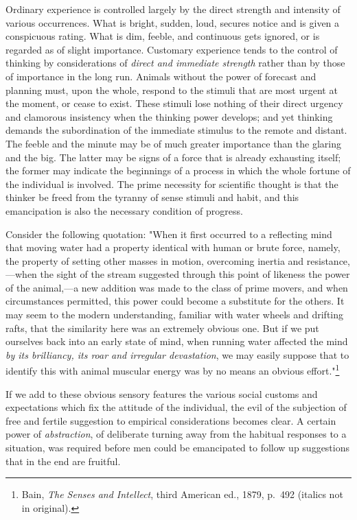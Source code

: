 \documentclass[showtrims,ustradepaper]{memoir}
\begin{document}
Ordinary experience is controlled largely by the direct strength and
intensity of various occurrences. What is bright, sudden, loud, secures
notice and is given a conspicuous rating. What is dim, feeble, and
continuous gets ignored, or is regarded as of slight importance.
Customary experience tends to the control of thinking by considerations
of \emph{direct and immediate strength} rather than by those of
importance in the long run. Animals without the power of forecast and
planning must, upon the whole, respond to the stimuli that are most
urgent at the moment, or cease to exist. These stimuli lose nothing of
their direct urgency and clamorous insistency when the thinking power
develops; and yet
thinking
demands the subordination of the immediate stimulus to the remote and
distant. The feeble and the minute may be of much greater importance
than the glaring and the big. The latter may be signs of a force that is
already exhausting itself; the former may indicate the beginnings of a
process in which the whole fortune of the individual is involved. The
prime necessity for scientific thought is that the thinker be freed from
the tyranny of sense stimuli and habit, and this emancipation is also
the necessary condition of progress.


Consider the following quotation: "When it first occurred to a
reflecting mind that moving water had a property identical with human or
brute force, namely, the property of setting other masses in motion,
overcoming inertia and resistance,---when the sight of the stream
suggested through this point of likeness the power of the animal,---a
new addition was made to the class of prime movers, and when
circumstances permitted, this power could become a substitute for the
others. It may seem to the modern understanding, familiar with water
wheels and drifting rafts, that the similarity here was an extremely
obvious one. But if we put ourselves back into an early state of mind,
when running water affected the mind \emph{by its brilliancy, its roar
and irregular devastation}, we may easily suppose that to identify this
with animal muscular energy was by no means an obvious
effort."\footnote{
Bain, \emph{The Senses and Intellect}, third American ed., 1879, p.\ 492
(italics not in original).
}


If we add to these obvious sensory features the various social customs
and expectations which fix the attitude of the individual, the evil of
the subjection of free and fertile suggestion to empirical
considerations
becomes
clear. A certain power of \emph{abstraction}, of deliberate turning away
from the habitual responses to a situation, was required before men
could be emancipated to follow up suggestions that in the end are
fruitful.
\end{document}
